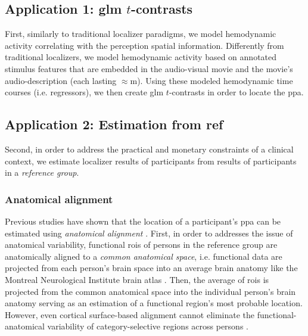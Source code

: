 \subsection{Application 1: \ac{glm} $t$-contrasts}



First, similarly to traditional localizer paradigms, we model hemodynamic
activity correlating with the perception spatial information.
Differently from traditional localizers, we model hemodynamic activity based on
annotated stimulus features that are embedded in the audio-visual movie and the
movie's audio-description (each lasting $\approx$\unit[120]{m}).
Using these modeled hemodynamic time courses (i.e. regressors), we then create
\ac{glm} $t$-contrasts in order to locate the \ac{ppa}.


\subsection{Application 2: Estimation from ref}



Second, in order to address the practical and monetary constraints of a clinical
context, we estimate localizer results of participants from results of
participants in a \textit{reference group}.


\subsubsection{Anatomical alignment}
Previous studies have shown that the location of a participant's \ac{ppa} can be
estimated using \textit{anatomical alignment} \citep{frost2012measuring,
rosenke2021probabilistic, weiner2018defining, zhen2017quantifying}.
%
First, in order to addresses the issue of anatomical variability, functional
\acp{roi} of persons in the reference group are anatomically aligned to a
\textit{common anatomical space}, i.e. functional data are projected from each
person's brain space into an average brain anatomy like the Montreal
Neurological Institute brain atlas \citep[MNI152,][]{fonov2011unbiased}.
%
Then, the average of \acp{roi} is projected from the common anatomical space
into the individual person's brain anatomy serving as an estimation of a
functional region's most probable location.
%
However, even cortical surface-based alignment \citep{fischl1999cortical,
yeo2009spherical} cannot eliminate the functional-anatomical variability of
category-selective regions across persons \citep{frost2012measuring,
weiner2018defining, weiner2014mid}.


